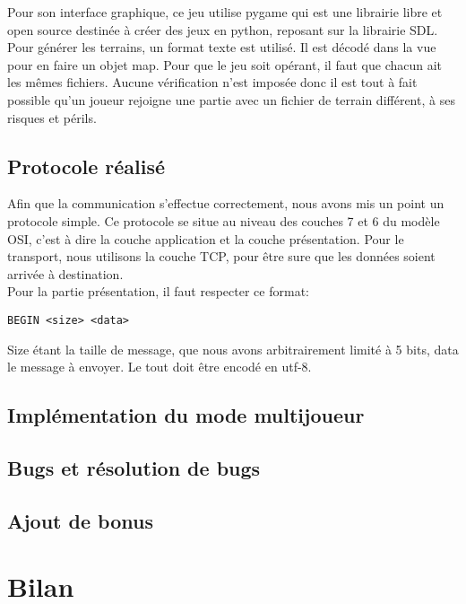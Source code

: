 \documentclass[12pt]{article}
\begin{document}
Pour son interface graphique, ce jeu utilise pygame qui est une librairie libre et open source destinée à créer des jeux en python, reposant sur la librairie SDL.
\\

Pour générer les terrains, un format texte est utilisé. Il est décodé dans la vue pour en faire un objet map. Pour que le jeu soit opérant, il faut que chacun ait les mêmes fichiers. Aucune vérification n'est imposée donc il est tout à fait possible qu'un joueur rejoigne une partie avec un fichier de terrain différent, à ses risques et périls.
\subsection{Protocole réalisé}
Afin que la communication s'effectue correctement, nous avons mis un point un protocole simple.
Ce protocole se situe au niveau des couches 7 et 6 du modèle OSI, c'est à dire la couche application et la couche présentation. Pour le transport, nous utilisons la couche TCP, pour être sure que les données soient arrivée à destination.
\\
Pour la partie présentation, il faut respecter ce format:\\
\begin{lstlisting}
BEGIN <size> <data>
\end{lstlisting}
Size étant la taille de message, que nous avons arbitrairement limité à 5 bits,
data le message à envoyer.
Le tout doit être encodé en utf-8.

\subsection{Implémentation du mode multijoueur}

\subsection{Bugs et résolution de bugs}

\subsection{Ajout de bonus}
\newpage

\section{Bilan}
\end{document}
